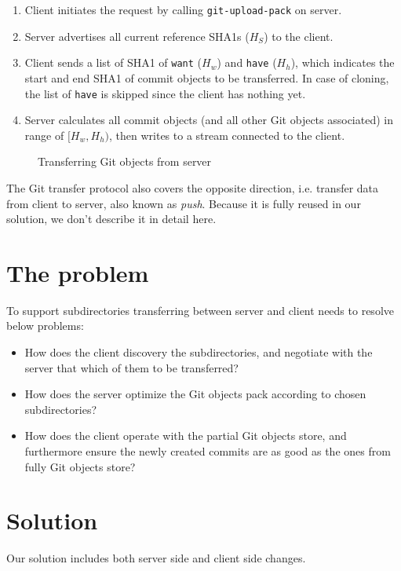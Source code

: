 \documentclass[preprint]{sigplanconf}
\begin{document}
\begin{enumerate}
  \item Client initiates the request by calling \verb|git-upload-pack| on server.
  \item Server advertises all current reference SHA1s ($H_S$) to the client.
  \item Client sends a list of SHA1 of \verb|want| ($H_w$) and \verb|have| ($H_h$), which indicates the start and end SHA1 of commit objects to be transferred.
    In case of cloning, the list of \verb|have| is skipped since the client has nothing yet.
  \item Server calculates all commit objects (and all other Git objects associated) in range of $[H_w, H_h)$, then writes to a stream connected to the client.
\end{enumerate}

\begin{figure}
  \centering
  
  \caption{Transferring Git objects from server}
  \label{fig:git-proto-clone-seq}
\end{figure}
The Git transfer protocol also covers the opposite direction, i.e. transfer
data from client to server, also known as \emph{push}.
Because it is fully reused in our solution, we don't describe it in detail
here.

\section{The problem}
To support subdirectories transferring between server and client needs to resolve below problems:
\begin{itemize}
  \item How does the client discovery the subdirectories, and negotiate with
      the server that which of them to be transferred?
  \item How does the server optimize the Git objects pack according to chosen
      subdirectories?
  \item How does the client operate with the partial Git objects store, and
      furthermore ensure the newly created commits are as good as the ones
      from fully Git objects store?
\end{itemize}

\section{Solution}
Our solution includes both server side and client side changes.
\end{document}
